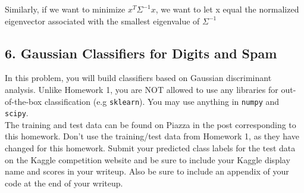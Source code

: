 \documentclass{article}
\begin{document}
\begin{enumerate}[label=(\alph*)]
\begin{mdframed}
    Similarly, if we want to minimize $x^T\Sigma^{-1}x$, we want to let x equal the normalized eigenvector associated with the smallest eigenvalue of $\Sigma^{-1}$
    \end{mdframed}
\end{enumerate}

\newpage
\subsection*{6. Gaussian Classifiers for Digits and Spam}
In this problem, you will build classifiers based on Gaussian discriminant analysis. Unlike Homework 1, you are NOT allowed to use any libraries for out-of-the-box classification (e.g \texttt{sklearn}). You may use anything in \texttt{numpy} and \texttt{scipy}. \\

\noindent
The training and test data can be found on Piazza in the post corresponding to this homework. Don’t use the training/test data from Homework 1, as they have changed for this homework. Submit your predicted class labels for the test data on the Kaggle competition website and be sure to include your Kaggle display name and scores in your writeup. Also be sure to include an appendix of your code at the end of your writeup.
\end{document}
